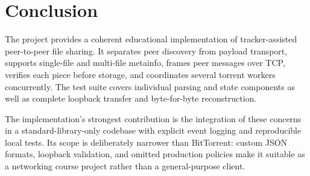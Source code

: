 \section{Conclusion}
\label{sec:conclusion}

The project provides a coherent educational implementation of tracker-assisted peer-to-peer file sharing. It separates peer discovery from payload transport, supports single-file and multi-file metainfo, frames peer messages over TCP, verifies each piece before storage, and coordinates several torrent workers concurrently. The test suite covers individual parsing and state components as well as complete loopback transfer and byte-for-byte reconstruction.

The implementation's strongest contribution is the integration of these concerns in a standard-library-only codebase with explicit event logging and reproducible local tests. Its scope is deliberately narrower than BitTorrent: custom JSON formats, loopback validation, and omitted production policies make it suitable as a networking course project rather than a general-purpose client.
